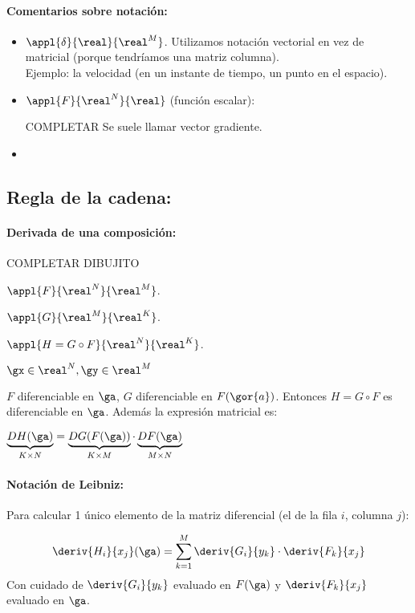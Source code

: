 \documentclass{apuntes}
\begin{document}
\paragraph{Comentarios sobre notación: }
\begin{itemize}
 \item $\appl{\delta}{\real}{\real^M}$. Utilizamos notación vectorial en vez de matricial (porque tendríamos una matriz columna).\\
 Ejemplo: la velocidad (en un instante de tiempo, un punto en el espacio).
 \item $\appl{F}{\real^N}{\real}$ (función escalar):

 COMPLETAR
 Se suele llamar vector gradiente.
 \item 
\end{itemize}

\subsection{Regla de la cadena: }
\paragraph{Derivada de una composición:\\}

COMPLETAR DIBUJITO

$\appl{F}{\real^N}{\real^M}$. 

$\appl{G}{\real^M}{\real^K}$.

$\appl{H=G\circ F}{\real^N}{\real^K}$.

$ \gx \in \real^N, \gy \in \real^M$

$F$ diferenciable en $\ga$, $G$ diferenciable en $F(\gor{a})$. Entonces $H=G\circ F$ es diferenciable en $\ga $.
Además la expresión matricial es:

$\underbrace{DH(\ga)}_{K\times N} = \underbrace{DG(F(\ga))}_{K\times M}\cdot \underbrace{DF(\ga)}_{M\times N}$
 
\obs
\paragraph{Notación de Leibniz:}

Para calcular 1 único elemento de la matriz diferencial (el de la fila $i$, columna $j$):

$$\deriv{H_i}{x_j}(\ga) = \displaystyle\sum_{k=1}^M \deriv{G_i}{y_k}\cdot\deriv{F_k}{x_j}$$
Con cuidado de $\displaystyle \deriv{G_i}{y_k}$ evaluado en $\displaystyle F(\ga)$ y $\displaystyle\deriv{F_k}{x_j}$ evaluado en $\ga$.
\end{document}
